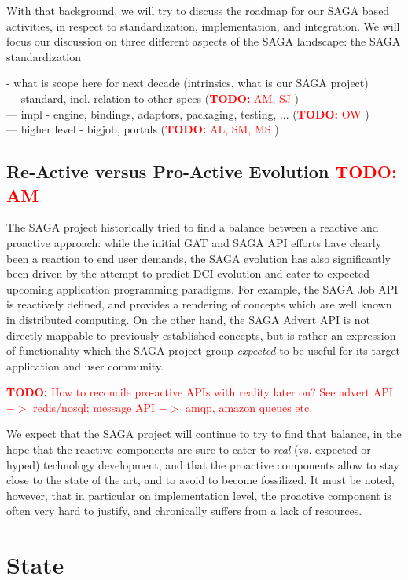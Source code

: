\documentclass{article}
\newcommand{\I}[1]{\textit{#1}}
\newcommand{\B}[1]{\textbf{#1}}
\newcommand{\nind}{\noindent}
\newcommand{\todo}[1]{{\textcolor{red}{\B{TODO:} #1 }}}
\begin{document}
 With that background, we will try to discuss the roadmap for our SAGA
 based activities, in respect to standardization, implementation, and
 integration.  We will focus our discussion on three different aspects
 of the SAGA landscape: the SAGA standardization 

 \nind
 - what is scope here for next decade (intrinsics, what is our SAGA project)\\
 --- standard, incl. relation to other specs (\todo{AM, SJ} )\\
 --- impl - engine, bindings, adaptors, packaging, testing, ... (\todo{OW})\\
 --- higher level - bigjob, portals (\todo{AL, SM, MS})\\
      

 \subsection{Re-Active versus Pro-Active Evolution \todo{AM}}

  The SAGA project historically tried to find a balance between a
  reactive and proactive approach: while the initial GAT and SAGA API
  efforts have clearly been a reaction to end user demands, the SAGA
  evolution has also significantly been driven by the attempt to
  predict DCI evolution and cater to expected upcoming application
  programming paradigms.  For example, the SAGA Job API is reactively
  defined, and provides a rendering of concepts which are well known
  in distributed computing.  On the other hand, the SAGA Advert API is
  not directly mappable to previously established concepts, but is
  rather an expression of functionality which the SAGA project group
  \I{expected} to be useful for its target application and user
  community.

  \todo{How to reconcile pro-active APIs with reality later on?  See
  advert API $->$ redis/nosql; message API $->$ amqp, amazon queues
  etc.}
  
  We expect that the SAGA project will continue to try to find that
  balance, in the hope that the reactive components are sure to cater
  to \I{real} (vs. expected or hyped) technology development, and that
  the proactive components allow to stay close to the state of the
  art, and to avoid to become fossilized.  It must be noted, however,
  that in particular on implementation level, the proactive component
  is often very hard to justify, and chronically suffers from a lack
  of resources.


\section{State}
\end{document}
